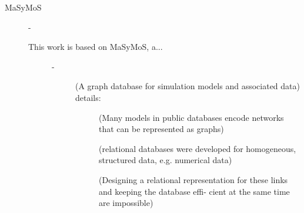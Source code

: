 \begin{description}
\begin{description}
\begin{description}
      \item[MaSyMoS] - 
      \begin{description}
        \item[This work is based on MaSyMoS, a...] - 
        \begin{description}
          \item[ \cite{Henkel2015} ] (A graph database for simulation models and associated data) details:
          \begin{description}
            \item[ \cite{Henkel2015} ] (Many models in public databases encode networks that can be represented as graphs)
            \item[ \cite{Henkel2015} ] (relational databases were developed for homogeneous, structured data, e.g. numerical data)
            \item[ \cite{Henkel2015} ] (Designing a relational representation for these links and keeping the database effi- cient at the same time are impossible)
          \end{description} %


\end{description}
\end{description}
\end{description}
\end{description}
\end{description}
